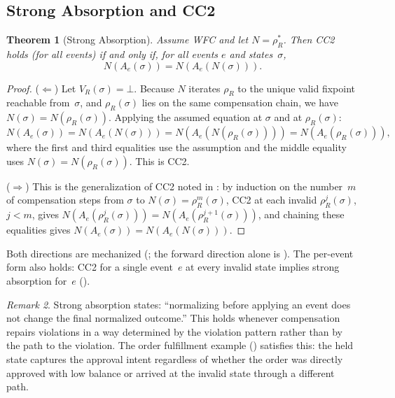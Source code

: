 \documentclass[11pt,a4paper]{article}
\theoremstyle{plain}
\newtheorem{theorem}{Theorem}[section]
\theoremstyle{definition}
\theoremstyle{remark}
\newtheorem{remark}[theorem]{Remark}
\renewcommand{\_}{\textunderscore\allowbreak}
\begin{document}
\subsection{Strong Absorption and CC2}

\begin{theorem}[Strong Absorption]
\label{thm:strong-absorption}
Assume WFC and let $N = \rho_R^*$.  Then CC2 holds (for all events) if and
only if, for all events $e$ and states~$\sigma$,
\[
N(A_e(\sigma)) = N(A_e(N(\sigma))).
\]
\end{theorem}

\begin{proof}
($\Leftarrow$) Let $V_R(\sigma) = \bot$.  Because $N$ iterates $\rho_R$ to the
unique valid fixpoint reachable from~$\sigma$, and $\rho_R(\sigma)$ lies on the
same compensation chain, we have $N(\sigma) = N(\rho_R(\sigma))$.  Applying the
assumed equation at $\sigma$ and at $\rho_R(\sigma)$:
\[
N(A_e(\sigma)) = N(A_e(N(\sigma))) = N(A_e(N(\rho_R(\sigma)))) = N(A_e(\rho_R(\sigma))),
\]
where the first and third equalities use the assumption and the middle equality
uses $N(\sigma) = N(\rho_R(\sigma))$.  This is CC2.

($\Rightarrow$) This is the generalization of CC2 noted in
: by induction on the number~$m$ of compensation steps
from $\sigma$ to $N(\sigma) = \rho_R^m(\sigma)$, CC2 at each invalid
$\rho_R^j(\sigma)$, $j < m$, gives
$N(A_e(\rho_R^j(\sigma))) = N(A_e(\rho_R^{j+1}(\sigma)))$, and chaining these
equalities gives $N(A_e(\sigma)) = N(A_e(N(\sigma)))$.
\end{proof}

Both directions are mechanized (;
the forward direction alone is ).  The
per-event form also holds: CC2 for a single event~$e$ at every invalid state
implies strong absorption for~$e$ ().

\begin{remark}
Strong absorption states: ``normalizing before applying an event does not
change the final normalized outcome.''  This holds whenever compensation
repairs violations in a way determined by the violation pattern rather than by
the path to the violation.  The order fulfillment example
() satisfies this: the held state captures the approval
intent regardless of whether the order was directly approved with low balance
or arrived at the invalid state through a different path.
\end{remark}
\end{document}
